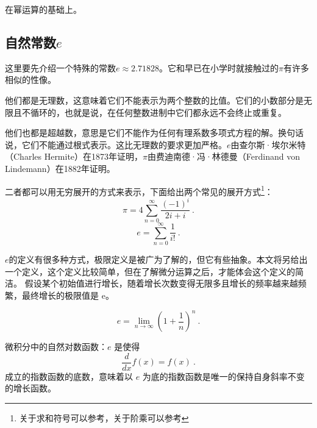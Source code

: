 
\begin{issues}
\issueDraft
\end{issues}


在幂运算的基础上。

\subsection{自然常数$e$}

这里要先介绍一个特殊的常数$e \approx 2.71828$。它和早已在小学时就接触过的$\pi$有许多相似的性像。

他们都是无理数，这意味着它们不能表示为两个整数的比值。它们的小数部分是无限且不循环的，也就是说，在任何整数进制中它们都永远不会终止或重复。

他们也都是超越数，意思是它们不能作为任何有理系数多项式方程的解。换句话说，它们不能通过根式表示。这比无理数的要求更加严格。$e$由查尔斯·埃尔米特（Charles Hermite）在1873年证明，$\pi$由费迪南德·冯·林德曼（Ferdinand von Lindemann）在1882年证明。

二者都可以用无穷展开的方式来表示，下面给出两个常见的展开方式\footnote{关于求和符号可以参考，关于阶乘可以参考}：
\begin{equation}
\pi=4\sum_{n=0}^\infty\frac{(-1)^i}{2i+i}~.
\end{equation}
\begin{equation}
e=\sum_{n=0}^\infty\frac{1}{i!}~.
\end{equation}

$e$的定义有很多种方式，极限定义是被广为了解的，但它有些抽象。本文将另给出一个定义，这个定义比较简单，但在了解微分运算之后，才能体会这个定义的简洁。
假设某个初始值进行增长，随着增长次数变得无限多且增长的频率越来越频繁，最终增长的极限值是 e。

\begin{equation}
e = \lim_{n \to \infty} \left( 1 + \frac{1}{n} \right)^n~.
\end{equation}


微积分中的自然对数函数：$e$ 是使得
\begin{equation}
\frac{d}{dx} f(x) = f(x)~.
\end{equation}
成立的指数函数的底数，意味着以 $e$ 为底的指数函数是唯一的保持自身斜率不变的增长函数。

